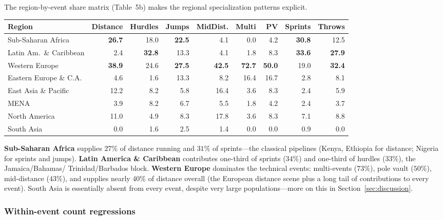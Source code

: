 \documentclass[11pt]{article}
\begin{document}
The region-by-event share matrix (Table~5b) makes the regional
specialization patterns explicit.

\begin{center}
\footnotesize
\begin{tabular}{lrrrrrrrr}
\toprule
Region & Distance & Hurdles & Jumps & MidDist. & Multi & PV & Sprints & Throws \\
\midrule
Sub-Saharan Africa     & \textbf{26.7} & 18.0 & \textbf{22.5} &  4.1 &  0.0 &  4.2 & \textbf{30.8} & 12.5 \\
Latin Am.\ \& Caribbean &  2.4 & \textbf{32.8} & 13.3 &  4.1 &  1.8 &  8.3 & \textbf{33.6} & \textbf{27.9} \\
Western Europe         & \textbf{38.9} & 24.6 & \textbf{27.5} & \textbf{42.5} & \textbf{72.7} & \textbf{50.0} & 19.0 & \textbf{32.4} \\
Eastern Europe \& C.A. &  4.6 &  1.6 & 13.3 &  8.2 & 16.4 & 16.7 &  2.8 &  8.1 \\
East Asia \& Pacific   & 12.2 &  8.2 &  5.8 & 16.4 &  3.6 &  8.3 &  2.4 &  5.9 \\
MENA                   &  3.9 &  8.2 &  6.7 &  5.5 &  1.8 &  4.2 &  2.4 &  3.7 \\
North America          & 11.0 &  4.9 &  8.3 & 17.8 &  3.6 &  8.3 &  7.1 &  8.8 \\
South Asia             &  0.0 &  1.6 &  2.5 &  1.4 &  0.0 &  0.0 &  0.9 &  0.0 \\
\bottomrule
\end{tabular}
\end{center}

\textbf{Sub-Saharan Africa} supplies $27\%$ of distance running and
$31\%$ of sprints---the classical pipelines (Kenya, Ethiopia for
distance; Nigeria for sprints and jumps).
\textbf{Latin America \& Caribbean} contributes one-third of sprints
($34\%$) and one-third of hurdles ($33\%$), the Jamaica/Bahamas/
Trinidad/Barbados block.
\textbf{Western Europe} dominates the technical events:
multi-events ($73\%$), pole vault ($50\%$), mid-distance ($43\%$),
and supplies nearly $40\%$ of distance overall (the European
distance scene plus a long tail of contributions to every event).
South Asia is essentially absent from every event, despite very
large populations---more on this in Section~\ref{sec:discussion}.

\subsubsection*{Within-event count regressions}
\end{document}
